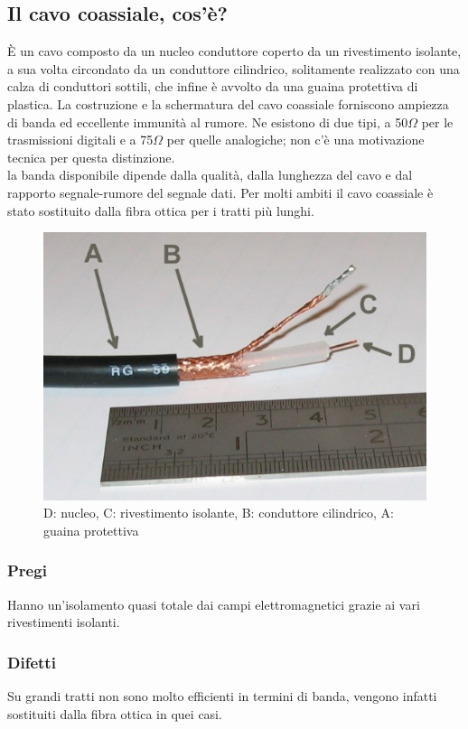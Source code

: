 \subsection{Il cavo coassiale, cos'è?} 
È un cavo composto da un nucleo conduttore coperto da un rivestimento isolante, a sua volta circondato da un conduttore cilindrico,
solitamente realizzato con una calza di conduttori sottili, che infine è avvolto da una guaina protettiva di plastica.
La costruzione e la schermatura del cavo coassiale forniscono ampiezza di banda ed eccellente immunità al rumore.
Ne esistono di due tipi, a 50$\Omega$ per le trasmissioni digitali e a 75$\Omega$ per quelle analogiche; non c’è una motivazione tecnica per questa distinzione. \\
la banda disponibile dipende dalla qualità, dalla lunghezza del cavo e dal rapporto segnale-rumore del segnale dati.
Per molti ambiti il cavo coassiale è stato sostituito dalla fibra ottica per i tratti più lunghi.

\begin{figure}[H]
\centering
\includegraphics[scale=1]{res/img/3_cavoCoassiale.jpg}
\caption{D: nucleo, C: rivestimento isolante, B: conduttore cilindrico, A: guaina protettiva}
\end{figure}

\subsubsection{Pregi}
Hanno un'isolamento quasi totale dai campi elettromagnetici grazie ai vari rivestimenti isolanti. 

\subsubsection{Difetti}
Su grandi tratti non sono molto efficienti in termini di banda, vengono infatti sostituiti dalla fibra ottica in quei casi.

